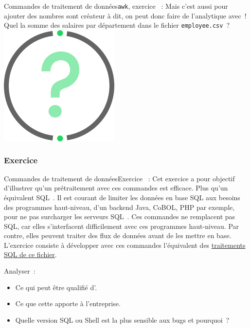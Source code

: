 \documentclass{beamer}
\begin{document}
    \begin{frame}{Commandes de traitement de données}{\lstinline{awk}, exercice \execcounterdispinc{}~:}
        Mais c'est aussi pour ajouter des nombres sont créateur à dit, on peut donc faire de l'analytique avec~!
        \bigbreak
        Quel la somme des salaires par département dans le fichier \lstinline{employee.csv}~?
        \bigbreak
        \centering
        \includegraphics[width=6cm]{image/question-mark}
    \end{frame}

    \subsubsection{Exercice}\label{subsubsec:data-exercice}
    \begin{frame}{Commandes de traitement de données}{Exercice \execcounterdispinc{}~:}
        Cet exercice a pour objectif d'illustrer qu'un prétraitement avec ces commandes est efficace.
        Plus qu'un équivalent SQL~.
        \bigbreak
        Il est courant de limiter les données en base SQL aux besoins des programmes haut-niveau, d'un backend Java, CoBOL, PHP par exemple, pour ne pas surcharger les serveurs SQL~.
        \bigbreak
        Ces commandes ne remplacent pas SQL, car elles s'interfacent difficilement avec ces programmes haut-niveau.
        \bigbreak
        Par contre, elles peuvent traiter des flux de données avant de les mettre en base.
        L'exercice consiste à développer avec ces commandes l'équivalent des \href{https://github.com/DigicompClassesByPapIT/linux2/blob/main/sqlite-hr.sh}{traitements SQL de ce fichier}.

        Analyser~:
        \begin{itemize}
            \item Ce qui peut être qualifié d'.
            \item Ce que cette  apporte à l'entreprise.
            \item Quelle version SQL ou Shell est la plus sensible aux bugs et pourquoi~?
        \end{itemize}
    \end{frame}
\end{document}
